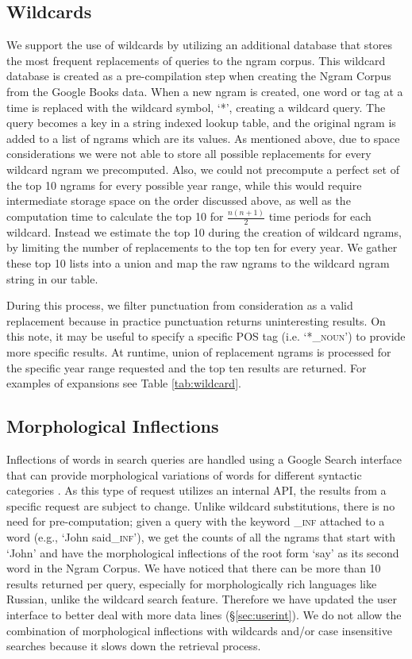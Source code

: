 \documentclass[11pt]{article}
\begin{document}
\subsection{Wildcards}
\label{sec:wildcards}
	We support the use of wildcards by utilizing an additional database that stores the most frequent replacements of queries to the ngram corpus. This wildcard database is created as a pre-compilation step when creating the Ngram Corpus from the Google Books data. When a new ngram is created, one word or tag at a time is replaced with the wildcard symbol, `*', creating a wildcard query. The query becomes a key in a string indexed lookup table, and the original ngram is added to a list of ngrams which are its values. As mentioned above, due to space considerations we were not able to store all possible replacements for every wildcard ngram we precomputed. Also, we could not precompute a perfect set of the top 10 ngrams for every possible year range, while this would require intermediate storage space on the order discussed above, as well as the computation time to calculate the top 10 for $\frac{n(n+1)}{2}$ time periods for each wildcard. Instead we estimate the top 10 during the creation of wildcard ngrams, by limiting the number of replacements to the top ten for every year. We gather these top 10 lists into a union and map the raw ngrams to the wildcard ngram string in our table. 
	
	During this process, we filter punctuation from consideration as a valid replacement because in practice punctuation returns uninteresting results. On this note, it may be useful to specify a specific POS tag (i.e. `*\textsf{\textsc{\_noun}}') to provide more specific results. At runtime, union of replacement ngrams is processed for the specific year range requested and the top ten results are returned. For examples of expansions see Table \ref{tab:wildcard}. 


\subsection{Morphological Inflections}
Inflections of words in search queries are handled using a Google Search interface that can provide morphological variations of words for different syntactic categories \cite{durrett2013supervised}. As this type of request utilizes an internal API, the results from a specific request are subject to change. Unlike wildcard substitutions, there is no need for pre-computation; given a query with the keyword \textsf{\textsc{\_inf}} attached to a word (e.g., `John said\textsf{\textsc{\_inf}}'), we get the counts of all the ngrams that start with `John' and have the morphological inflections of the root form `say' as its second word in the Ngram Corpus. We have noticed that there can be more than 10 results returned per query, especially for morphologically rich languages like Russian, unlike the wildcard search feature. Therefore we have updated the user interface to better deal with more data lines (\S\ref{sec:userint}). We do not allow the combination of morphological inflections with wildcards and/or case insensitive searches
because it slows down the retrieval process.
\end{document}
